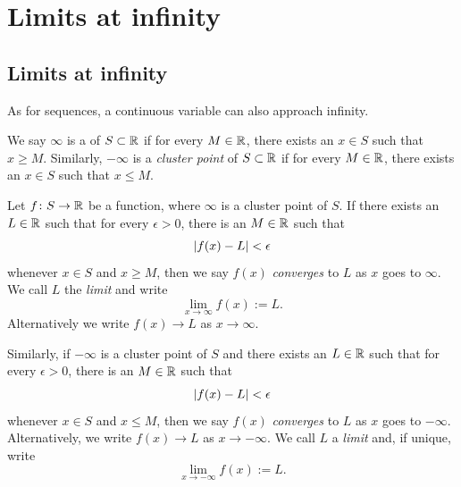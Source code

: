 
\sectionnewpage
\section{Limits at infinity}
\label{sec:limitatinf}


\subsection{Limits at infinity}

As for sequences, a continuous variable can also approach infinity.

\begin{defn}
We say $\infty$ is a \emph{} of $S \subset {\mathbb{R}}$ if for every
$M \in {\mathbb{R}}$, there exists an $x \in S$ such that $x \geq M$.  Similarly,
$- \infty$ is a \emph{cluster point} of $S \subset {\mathbb{R}}$ if for every
$M \in {\mathbb{R}}$, there exists an $x \in S$ such that $x \leq M$.

%
Let $f \colon S \to {\mathbb{R}}$ be a function, where 
$\infty$ is a cluster point of $S$.
If there exists an $L \in {\mathbb{R}}$
such that for every $\epsilon > 0$, there is an $M \in {\mathbb{R}}$ such that
\begin{equation*}
\left\lvert {f(x) - L} \right\rvert < \epsilon 
\end{equation*}
whenever $x \in S$ and $x \geq M$, then we say $f(x)$
\emph{converges} to $L$
as $x$ goes to $\infty$.  We call $L$ the \emph{limit}
and write
\begin{equation*}
\lim_{x \to \infty} f(x) := L .
\end{equation*}
Alternatively we write $f(x) \to L$ as $x \to \infty$.

Similarly, if $-\infty$ is a cluster point of $S$
and
there exists an $L \in {\mathbb{R}}$
such that for every $\epsilon > 0$, there is an $M \in {\mathbb{R}}$ such that
\begin{equation*}
\left\lvert {f(x) - L} \right\rvert < \epsilon 
\end{equation*}
whenever $x \in S$ and $x \leq M$, then we say $f(x)$ \emph{converges} to $L$
as $x$ goes to $-\infty$.
Alternatively, we write $f(x) \to L$ as $x \to -\infty$.
We call $L$ a \emph{limit} and, if unique, write
\begin{equation*}
\lim_{x \to -\infty} f(x) := L .
\end{equation*}
\end{defn}

